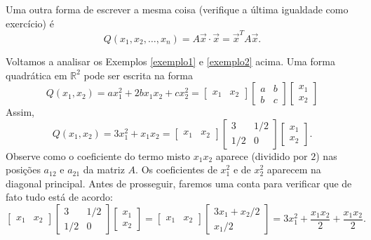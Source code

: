 \noindent Uma outra forma de escrever a mesma coisa (verifique a última igualdade como exercício) é
\begin{equation}
Q(x_1, x_2, \dots, x_n) = A \vec{x}  \cdot \vec{x} = \vec{x}^T A \vec{x}.
\end{equation}


\begin{ex}
	Voltamos a analisar os Exemplos \ref{exemplo1} e \ref{exemplo2} acima. Uma forma quadrática em $\mathbb{R}^2$ pode ser escrita na forma
	\begin{equation}
	Q(x_1, x_2) = a x_1^2 + 2 b x_1x_2 + cx_2^2 =
	\begin{bmatrix}
	x_1 & x_2
	\end{bmatrix}
	\begin{bmatrix}
	a & b \\ b & c
	\end{bmatrix}
	\begin{bmatrix}
	x_1 \\ x_2
	\end{bmatrix}
	\end{equation} Assim,
	\begin{equation}
	Q(x_1, x_2) = 3 x_1^2 + x_1x_2 =
	\begin{bmatrix}
	x_1 & x_2
	\end{bmatrix}
	\begin{bmatrix}
	3 & 1/2 \\
	1/2 & 0
	\end{bmatrix}
	\begin{bmatrix}
	x_1 \\ x_2
	\end{bmatrix}.
	\end{equation} Observe como o coeficiente do termo misto $x_1 x_2$ aparece (dividido por $2$) nas posições $a_{12}$ e $a_{21}$ da matriz $A$. Os coeficientes de $x_1^2$ e de $x_2^2$ aparecem na diagonal principal. Antes de prosseguir, faremos uma conta para verificar que de fato tudo está de acordo:
	\begin{equation}
	\begin{bmatrix}
	x_1 & x_2
	\end{bmatrix}
	\begin{bmatrix}
	3 & 1/2 \\
	1/2 & 0
	\end{bmatrix}
	\begin{bmatrix}
	x_1 \\ x_2
	\end{bmatrix} =
	\begin{bmatrix}
	x_1 & x_2
	\end{bmatrix}
	\begin{bmatrix}
	3x_1 + x_2/2 \\
	x_1/2
	\end{bmatrix} = 3 x_1^2 + \frac{x_1x_2}{2} + \frac{x_1x_2}{2}.
	\end{equation}


\end{ex}
